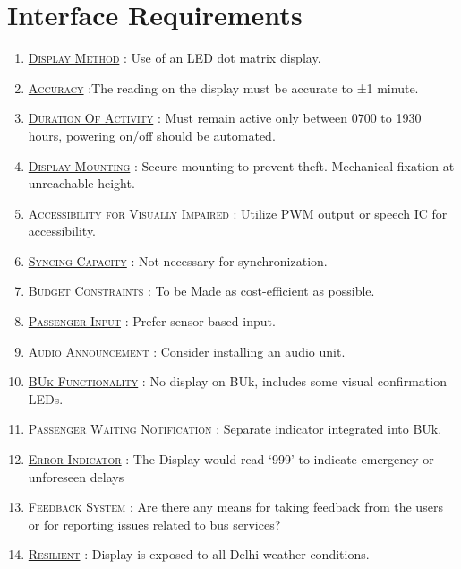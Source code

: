 \section{Interface Requirements}

\begin{enumerate}
    \item {}\underline{\textsc{Display Method}} : Use of an LED dot matrix display.

    \item \underline{\textsc{Accuracy}} :The reading on the display must be accurate to ±1 minute.

    \item \underline{\textsc{Duration Of Activity}} : Must remain active only between 0700 to 1930 hours, powering on/off should be automated.

    \item {}\underline{\textsc{Display Mounting}} : Secure mounting to prevent theft. Mechanical fixation at unreachable height.

    \item \underline{\textsc{Accessibility for Visually Impaired}} :  Utilize PWM output or speech IC for accessibility.

    \item {}\underline{\textsc{Syncing Capacity}} : Not necessary for synchronization.

    \item {}\underline{\textsc{Budget Constraints}} : To be Made as cost-efficient as possible.

    \item {}\underline{\textsc{Passenger Input}} : Prefer sensor-based input.

    \item \underline{\textsc{Audio Announcement}} : Consider installing an audio unit.

    \item {}\underline{\textsc{BUk Functionality}} : No display on BUk, includes some visual confirmation LEDs.

    \item \underline{\textsc{Passenger Waiting Notification}} : Separate indicator integrated into BUk.

    \item {}\underline{\textsc{Error Indicator}} : The Display would read ‘999’ to indicate emergency or unforeseen delays

    \item \underline{\textsc{Feedback System}} : Are there any means for taking feedback from the users or for reporting issues related to bus services?

    \item \underline{\textsc{Resilient}} : Display is exposed to all Delhi weather conditions.
   
\end{enumerate}